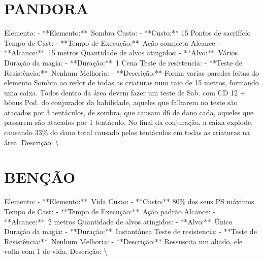\documentclass{article}%
\begin{document}
%
\section{PANDORA}%
\label{sec:PANDORA}%
Elemento: {-} **Elemento:**~Sombra\newline%
Custo: {-} **Custo:** 15 Pontos de sacrifício\newline%
Tempo de Cast: {-} **Tempo de Execução:**~Ação completa\newline%
Alcance: {-} **Alcance:**~15 metros\newline%
Quantidade de alvos atingidos: {-} **Alvo:**~Vários\newline%
Duração da magia: {-} **Duração:**~1 Cena\newline%
Teste de resistencia: {-} **Teste de Resistência:**~Nenhum\newline%
Melhoria: {-} **Descrição:** Forma varias paredes feitas do elemento Sombra ao redor de todas as criaturas num raio de 15 metros, formando uma caixa. Todos dentro da área devem fazer um teste de Sab. com CD 12 + bônus Pod. do conjurador da habilidade, aqueles que falharem no teste são atacados por 3 tentáculos, de sombra, que causam d6 de dano cada, aqueles que passarem são atacados por 1 tentáculo. No final da conjuração, a caixa explode, causando 33\% do dano total causado pelos tentáculos em todas as criaturas na área.\newline%
Descrição: \textbackslash{}

%
\section{BENÇÃO}%
\label{sec:BENO}%
Elemento: {-} **Elemento:**~Vida\newline%
Custo: {-} **Custo:** 80\% dos seus PS máximos\newline%
Tempo de Cast: {-} **Tempo de Execução:**~Ação padrão\newline%
Alcance: {-} **Alcance:**~2 metros\newline%
Quantidade de alvos atingidos: {-} **Alvo:**~Único\newline%
Duração da magia: {-} **Duração:**~Instantânea\newline%
Teste de resistencia: {-} **Teste de Resistência:**~Nenhum\newline%
Melhoria: {-} **Descrição:** Ressuscita um aliado, ele volta com 1 de vida.\newline%
Descrição: \textbackslash{}

%
\end{document}
